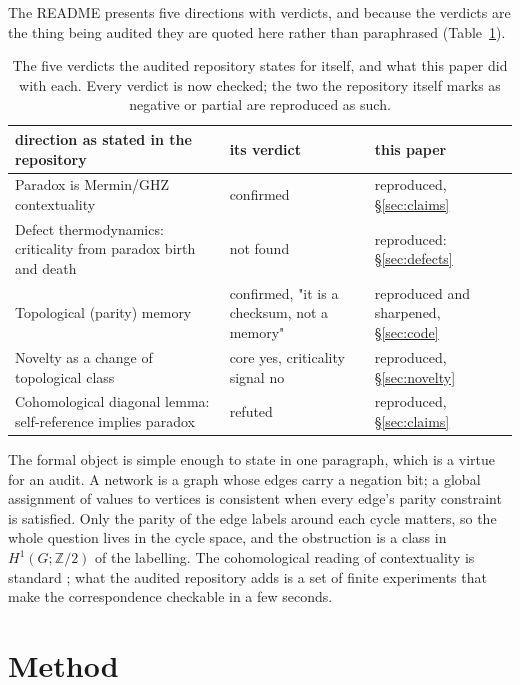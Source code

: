 \documentclass[11pt,a4paper]{article}
\begin{document}
The README presents five directions with verdicts, and because the verdicts are the thing being
audited they are quoted here rather than paraphrased
(Table~\ref{tab:verdicts}).

\begin{table}[t]
\centering
\footnotesize
\begin{tabular}{@{}p{}p{}p{}@{}}
\toprule
direction as stated in the repository & its verdict & this paper \\
\midrule
Paradox is Mermin/GHZ contextuality & confirmed & reproduced, \S\ref{sec:claims} \\
Defect thermodynamics: criticality from paradox birth and death & not found & reproduced: \S\ref{sec:defects} \\
Topological (parity) memory & confirmed, "it is a checksum, not a memory" & reproduced and sharpened, \S\ref{sec:code} \\
Novelty as a change of topological class & core yes, criticality signal no & reproduced, \S\ref{sec:novelty} \\
Cohomological diagonal lemma: self-reference implies paradox & refuted & reproduced, \S\ref{sec:claims} \\
\bottomrule
\end{tabular}
\caption{The five verdicts the audited repository states for itself, and what this paper did with
each. Every verdict is now checked; the two the repository itself marks as negative or partial are
reproduced as such.}
\label{tab:verdicts}
\end{table}

The formal object is simple enough to state in one paragraph, which is a virtue for an audit. A
network is a graph whose edges carry a negation bit; a global assignment of values to vertices is
consistent when every edge's parity constraint is satisfied. Only the parity of the edge labels
around each cycle matters, so the whole question lives in the cycle space, and the obstruction is
a class in $H^1(G;\mathbb{Z}/2)$ of the labelling. The cohomological reading of contextuality is
standard \citep{abramsky2011,abramsky2012}; what the audited repository adds is a set of finite
experiments that make the correspondence checkable in a few seconds.

\section{Method}
\label{sec:method}
\end{document}
